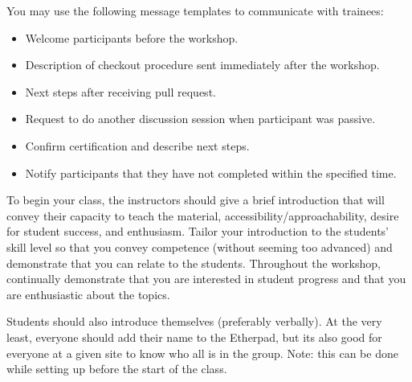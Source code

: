 
You may use the following message templates to communicate with
trainees:

\begin{itemize}
\item
  Welcome participants before the workshop.
\item
  Description of checkout procedure sent immediately after the workshop.
\item
  Next steps after receiving pull request.
\item
  Request to do another discussion session when participant was passive.
\item
  Confirm certification and describe next steps.
\item
  Notify participants that they have not completed within the specified time.
\end{itemize}


To begin your class, the instructors should give a brief introduction
that will convey their capacity to teach the material,
accessibility/approachability, desire for student success, and
enthusiasm. Tailor your introduction to the students' skill level so
that you convey competence (without seeming too advanced) and
demonstrate that you can relate to the students. Throughout the
workshop, continually demonstrate that you are interested in student
progress and that you are enthusiastic about the topics.

Students should also introduce themselves (preferably verbally). At the
very least, everyone should add their name to the Etherpad, but its also
good for everyone at a given site to know who all is in the group. Note:
this can be done while setting up before the start of the class.


